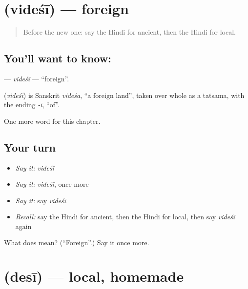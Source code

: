 \section[\texorpdfstring{\hi{विदेशी} (videśī)}{विदेशी (videśī)}]{ (videśī) — foreign}

\label{lesson:HI-C240-videsi}



\begin{quote}
Before the new one: say the Hindi for ancient, then the Hindi for local.
\end{quote}

\subsection*{You'll want to know: }
\textbf{} — \emph{videśī} — \textquotedblleft{}foreign\textquotedblright{}.

\begin{cousinweb}
\textbf{} (\emph{videśī}) is Sanskrit \emph{videśa}, \textquotedblleft{}a foreign land\textquotedblright{}, taken over whole as a tatsama, with the ending \emph{-ī}, \textquotedblleft{}of\textquotedblright{}.
\end{cousinweb}

\begin{grammarlens}[title={What you've built}]
One more word for this chapter.
\end{grammarlens}

\subsection*{Your turn}
\begin{itemize}
\raggedright
  \item \emph{Say it:} \emph{videśī}
  \item \emph{Say it:} \emph{videśī}, once more
  \item \emph{Say it:} say \emph{videśī}
  \item \emph{Recall:} say the Hindi for ancient, then the Hindi for local, then say \emph{videśī} again
\end{itemize}

\begin{tcolorbox}[breakable,colback=teal!4,colframe=teal!35!black,title={Before you move on}]
What does  mean? (\textquotedblleft{}Foreign\textquotedblright{}.) Say it once more.
\end{tcolorbox}
\section[\texorpdfstring{\hi{देसी} (desī)}{देसी (desī)}]{ (desī) — local, homemade}

